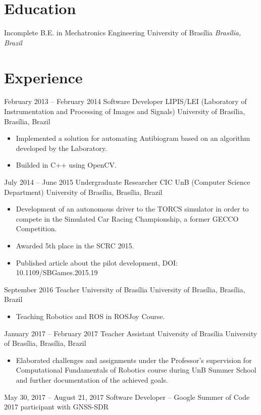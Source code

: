 \documentclass[letterpaper]{moderncv}        %
\begin{document}
\makecvtitle
\section{Education}
\cventry
{Incomplete}
{B.E. in Mechatronics Engineering}
{University of Brasília}
{}
{\textit{Brasília, Brazil}}
{}
\section{Experience}
\cventry
{February 2013 -- February 2014}
{Software Developer}
{LIPIS/LEI (Laboratory of Instrumentation and Processing of Images and Signals)}
{University of Brasília, Brasília, Brazil}
{}
{\begin{itemize}%
	\item Implemented a solution for automating Antibiogram based on an algorithm developed by the Laboratory.
	\item Builded in C++ using OpenCV.
	\end{itemize}}
\cventry
{July 2014 -- June 2015}
{Undergraduate Researcher}
{CIC UnB (Computer Science Department)}
{University of Brasília, Brasília, Brazil}
{}
{\begin{itemize}%
	\item Development of an autonomous driver to the TORCS simulator in order to compete in the Simulated Car Racing Championship, a former GECCO Competition.
	\item Awarded 5th place in the SCRC 2015.
	\item Published article about the pilot development, DOI: 10.1109/SBGames.2015.19
	\end{itemize}}
\cventry
{September 2016}
{Teacher}
{University of Brasília}
{University of Brasília, Brasília, Brazil}
{}
{\begin{itemize}%
	\item Teaching Robotics and ROS in ROSJoy Course.
	\end{itemize}}
\cventry
{January 2017 -- February 2017}
{Teacher Assistant}
{University of Brasília}
{University of Brasília, Brasília, Brazil}
{}
{\begin{itemize}%
	\item Elaborated challenges and assignments under the Professor's supervision for Computational Fundamentals of Robotics course during UnB Summer School and further documentation of the achieved goals.
	\end{itemize}}
\cventry
{May 30, 2017 -- August 21, 2017}
{Software Developer -- Google Summer of Code 2017 participant with GNSS-SDR}
\end{document}
